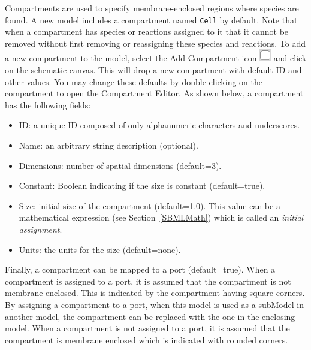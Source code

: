 \documentclass[titlepage,11pt]{article}
\begin{document}
\noindent
Compartments are used to specify membrane-enclosed regions where species are found. A new model includes a compartment named {\tt Cell} by default.  Note that when a compartment has species or reactions assigned to it that it cannot be removed without first removing or reassigning these species and reactions.  To add a new compartment to the model, select the Add Compartment icon \includegraphics{../gui/icons/modelview/add_compartment_selected} and click on the schematic canvas.  This will drop a new compartment with default ID and other values.  You may change these defaults by double-clicking on the compartment to open the Compartment Editor.  
As shown below, a compartment has the following fields:
\begin{itemize}
\item ID: a unique ID composed of only alphanumeric characters and underscores.
\item Name: an arbitrary string description (optional).
\item Dimensions: number of spatial dimensions (default=3).
\item Constant: Boolean indicating if the size is constant (default=true).
\item Size: initial size of the compartment (default=1.0).  This value can be a mathematical expression (see Section~\ref{SBMLMath}) which is called an \emph{initial assignment}.
\item Units: the units for the size (default=none).
\end{itemize}
Finally, a compartment can be mapped to a port (default=true).  When a compartment is assigned to a port, it is assumed that the compartment is not membrane enclosed.  This is indicated by the compartment having square corners.  By assigning a compartment to a port, when this model is used as a subModel in another model, the compartment can be replaced with the one in the enclosing model.  When a compartment is not assigned to a port, it is assumed that the compartment is membrane enclosed which is indicated with rounded corners.
\end{document}
